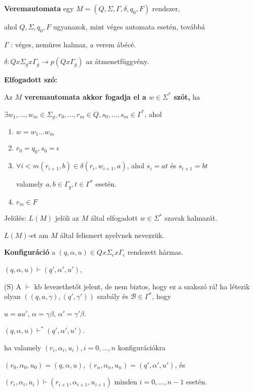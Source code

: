 \documentclass[10pt]{article}
\renewcommand{\\}{\par\noindent}
\begin{document}
\begin{frame}
\begin{tcolorbox}[title={Def.: Veremautomata, Elfgadott szó}]
\textbf{Veremautomata} egy $M = (Q, {\Sigma}, {\Gamma}, {\delta}, q_0, F)$ rendszer,\\
ahol $Q, {\Sigma}, q_0, F$ ugyanazok, mint véges automata esetén, továbbá\\
\medskip
$\Gamma$ : véges, nemüres halmaz, a verem ábécé.\\
$\delta : Q x {\Sigma}_g x {\Gamma}_g \rightarrow p(Q x {\Gamma}_g)$ az átmenetfüggvény.\\
\bigskip
\textbf{Elfogadott szó:}\\
Az \textbf{$M$ veremautomata akkor fogadja el a $w \in {\Sigma}^*$ szót,} ha\\
${\exists}w_1, ..., w_m \in {\Sigma}_g, r_0, ..., r_m \in Q, s_0, ..., s_m \in {\Gamma}^*$, ahol\\
\begin{enumerate}
\item $w = w_1...w_m$\\
\item $r_0 = q_0, s_0 = \epsilon$
\item ${\forall}i < m (r_{i + 1}, b) \in {\delta}(r_i, w_{i + 1}, a)$, ahol $s_i = at$ és $s_{i + 1} = bt$\\
valamely $a, b \in {\Gamma}_g, t \in {\Gamma}^*$ esetén.
\item $r_m \in F$
\end{enumerate}
\medskip
Jelölés: $L(M)$ jelöli az $M$ által elfogadott $w \in {\Sigma}^*$ szavak halmazát.\\
$L(M)$-et am $M$ által felismert nyelvnek nevezzük.
\end{tcolorbox}
\end{frame}

\begin{frame}
\begin{tcolorbox}[title={Def.: Konfiguráció}]
\textbf{Konfiguráció} a $(q, {\alpha}, u) \in Q x {\Sigma}_{\epsilon} x {\Gamma}_{\epsilon}$ rendezett hármas.\\
\medskip
$(q, {\alpha}, u) \vdash (q', {\alpha}', u')$,\\
{\tiny (S) A $\vdash$ kb levezethetőt jelent, de nem biztos, hogy ez a szakszó rá!}
\medskip
ha létezik olyan $((q, a, {\gamma}), (q', {\gamma}'))$ szabály és $\mathcal{B} \in {\Gamma}^*$, hogy\\
\medskip
$u = au'$, $\alpha = {\gamma}{\beta}$, ${\alpha}' = {\gamma}'{\beta}$.\\
\medskip
$(q, {\alpha}, u) {\vdash}^* (q', {\alpha}', u')$.\\
\medskip
ha valamely $(r_i, {\alpha}_i, u_i), i = 0, ..., n$ konfigurációkra\\
\medskip
$(r_0, {\alpha}_0, u_0) = (q, {\alpha}, u)$, $(r_n, {\alpha}_n, u_n) = (q', {\alpha}', u')$, és\\
$(r_i, {\alpha}_i, u_i) \vdash (r_{i + 1}, {\alpha}_{i + 1}, u_{i + 1})$ minden $i = 0, ..., n - 1$ esetén.\\
\end{tcolorbox}
\end{frame}
\end{document}

